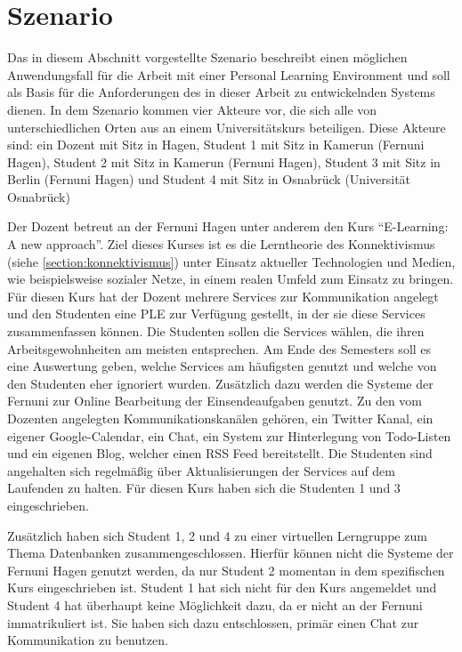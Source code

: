 \section{Szenario}\label{section:szenario}
Das in diesem Abschnitt vorgestellte Szenario beschreibt einen möglichen Anwendungsfall für die Arbeit mit einer Personal Learning Environment und soll als Basis für die Anforderungen des in dieser Arbeit zu entwickelnden Systems dienen. In dem Szenario kommen vier Akteure vor, die sich alle von unterschiedlichen Orten aus an einem Universitätskurs beteiligen. Diese Akteure sind: ein Dozent mit Sitz in Hagen, Student 1 mit Sitz in Kamerun (Fernuni Hagen), Student 2 mit Sitz in Kamerun (Fernuni Hagen), Student 3 mit Sitz in Berlin (Fernuni Hagen) und Student 4 mit Sitz in Osnabrück (Universität Osnabrück) 

Der Dozent betreut an der Fernuni Hagen unter anderem den Kurs "`E-Learning: A new approach"'. Ziel dieses Kurses ist es die Lerntheorie des Konnektivismus (siehe \ref{section:konnektivismus}) unter Einsatz aktueller Technologien und Medien, wie beispielsweise sozialer Netze, in einem realen Umfeld zum Einsatz zu bringen.  Für diesen Kurs hat der Dozent mehrere Services zur Kommunikation angelegt und den Studenten eine PLE zur Verfügung gestellt, in der sie diese Services zusammenfassen können. Die Studenten sollen die Services wählen, die ihren Arbeitsgewohnheiten am meisten entsprechen. Am Ende des Semesters soll es eine Auswertung geben, welche Services am häufigsten genutzt und welche von den Studenten eher ignoriert wurden. Zusätzlich dazu werden die Systeme der Fernuni zur Online Bearbeitung der Einsendeaufgaben genutzt. Zu den vom Dozenten angelegten Kommunikationskanälen gehören, ein Twitter Kanal, ein eigener Google-Calendar, ein Chat, ein System zur Hinterlegung von Todo-Listen und ein eigenen Blog, welcher einen RSS Feed bereitstellt. Die Studenten sind angehalten sich regelmäßig über Aktualisierungen der Services auf dem Laufenden zu halten. Für diesen Kurs haben sich die Studenten 1 und 3 eingeschrieben.

Zusätzlich haben sich Student 1, 2 und 4 zu einer virtuellen Lerngruppe zum Thema Datenbanken zusammengeschlossen. Hierfür können nicht die Systeme der Fernuni Hagen genutzt werden, da nur Student 2 momentan in dem spezifischen Kurs eingeschrieben ist. Student 1 hat sich nicht für den Kurs angemeldet und Student 4 hat überhaupt keine Möglichkeit dazu, da er nicht an der Fernuni immatrikuliert ist. Sie haben sich dazu entschlossen, primär einen Chat zur Kommunikation zu benutzen.

